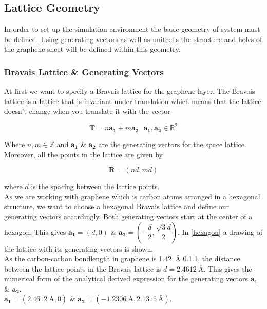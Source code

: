 \subsection{Lattice Geometry}

In order to set up the simulation environment the basic geometry of system must be defined. Using generating vectors as well as unitcells the structure and holes of the graphene sheet will be defined within this geometry. 

\subsubsection{Bravais Lattice \& Generating Vectors}
At first we want to specify a Bravais lattice for the graphene-layer. The Bravais lattice is a lattice that is invariant under translation which means that the lattice doesn't change when you translate it with the vector 

\begin{equation}
    \mathbf{T}=n\mathbf{a_{1}}+m\mathbf{a_{2}}\ \ \ \mathbf{a_{1}},\mathbf{a_{2}} \in \mathbb{R}^{2} 
\end{equation}

Where $n,m \in \mathbb{Z}$ and $\mathbf{a_{1}}$ \& $\mathbf{a_{2}}$ are the generating vectors for the space lattice. Moreover, all the points in the lattice are given by 

\begin{equation}
    \mathbf{R}=(nd,md) 
\end{equation}

where $d$ is the spacing between the lattice points. \\
As we are working with graphene which is carbon atoms arranged in a hexagonal structure, we want to choose a hexagonal Bravais lattice and define our generating vectors accordingly. Both generating vectors start at the center of a hexagon. This gives $\mathbf{a_{1}}=(d,0)$ \& $\mathbf{a_{2}}=\left(-\dfrac{d}{2},\dfrac{\sqrt{3}d}{2}\right)$. In \cref{hexagon} a drawing of the lattice with its generating vectors is shown.\\ 
As the carbon-carbon bondlength in graphene is \SI{1.42}{\angstrom} \cref{}, the distance between the lattice points  in the Bravais lattice is $d=\SI{2.4612}{\angstrom}$. This gives the numerical form of the analytical derived expression for the generating vectors  $\mathbf{a_{1}}$ \& $\mathbf{a_{2}}$. \\
$\mathbf{a_{1}}=(\SI{2.4612}{\angstrom},0)$ \& $\mathbf{a_{2}}=\left(-\SI{1.2306}{\angstrom},\SI{2.1315}{\angstrom}\right)$. 



